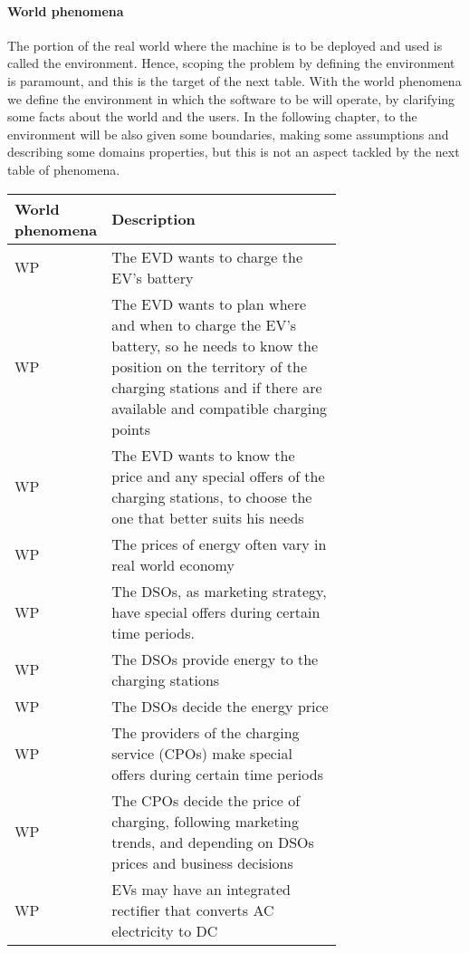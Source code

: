 \paragraph{World phenomena} The portion of the real world where the machine is to be deployed and used is called the environment. Hence, scoping the problem by defining the environment is paramount, and this is the target of the next table. With the world phenomena we define the environment in which the software to be will operate, by clarifying some facts about the world and the users. In the following chapter, to the environment will be also given some boundaries, making some assumptions and describing some domains properties, but this is not an aspect tackled by the next table of phenomena.
\setcounter{wp}{1}
\newcommand{\wpcount}{\thewp\stepcounter{wp}}
\begin{center}
    \begin{longtable}{|l|p{0.725\linewidth}|}
     \hline
     \textbf{World phenomena} & \textbf{Description} \\
     \hline
     WP\wpcount & The EVD wants to charge the EV's battery \\
     \hline
     WP\wpcount & The EVD wants to plan where and when to charge the EV's battery, so he needs to know the position on the territory of the charging stations and if there are available and compatible charging points\\
     \hline
     WP\wpcount & The EVD wants to know the price and any special offers of the charging stations, to choose the one that better suits his needs \\
     \hline
     WP\wpcount & The prices of energy often vary in real world economy \\ 
     \hline
     WP\wpcount & The DSOs, as marketing strategy, have special offers during certain time periods.\\
     \hline
     WP\wpcount & The DSOs provide energy to the charging stations \\
     \hline
     WP\wpcount & The DSOs decide the energy price\\
     \hline
     WP\wpcount & The providers of the charging service (CPOs) make special offers during certain time periods\\
     \hline
     WP\wpcount & The CPOs decide the price of charging, following marketing trends, and depending on DSOs prices and business decisions\\
     \hline
     WP\wpcount & EVs may have an integrated rectifier that converts AC electricity to DC \\

\end{longtable}
\end{center}
